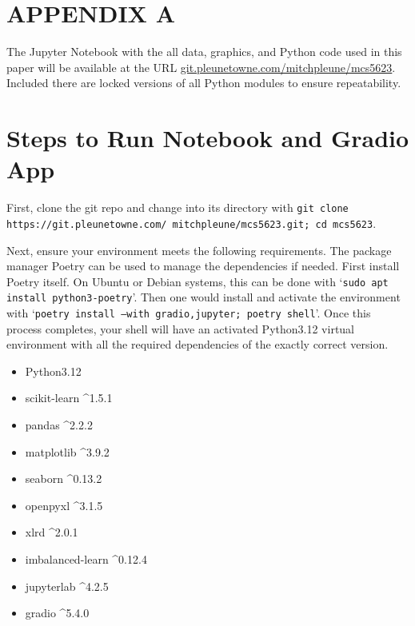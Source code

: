 \documentclass[conference]{IEEEtran}
\begin{document}
\section*{APPENDIX A}

The Jupyter Notebook with the all data, graphics, and Python code used in this paper will be
available at the URL
\href{https://git.pleunetowne.com/mitchpleune/mcs5623/}{git.pleunetowne.com/mitchpleune/mcs5623}.
Included there are locked versions of all Python modules to ensure
repeatability.

\section*{Steps to Run Notebook and Gradio App}

First, clone the git repo and change into its directory with \texttt{git clone
	https://git.pleunetowne.com/ mitchpleune/mcs5623.git; cd mcs5623}.

Next, ensure your environment meets the following requirements. The package
manager Poetry can be used to manage the dependencies if needed. First install
Poetry itself. On Ubuntu or Debian systems, this can be done with `\texttt{sudo
	apt install python3-poetry}'. Then one would install and activate the
environment with `\texttt{poetry install --with gradio,jupyter; poetry shell}'.
Once this process completes, your shell will have an activated Python3.12
virtual environment with all the required dependencies of the exactly correct
version.
\begin{multicols}{2}
	\begin{itemize}
		\small
		\item Python3.12
		\item scikit-learn \textasciicircum1.5.1
		\item pandas \textasciicircum2.2.2
		\item matplotlib \textasciicircum3.9.2
		\item seaborn \textasciicircum0.13.2
		\item openpyxl \textasciicircum3.1.5
		\item xlrd \textasciicircum2.0.1
		\item imbalanced-learn \textasciicircum0.12.4
		\item jupyterlab \textasciicircum4.2.5
		\item gradio \textasciicircum5.4.0
	\end{itemize}
\end{multicols}
\end{document}
